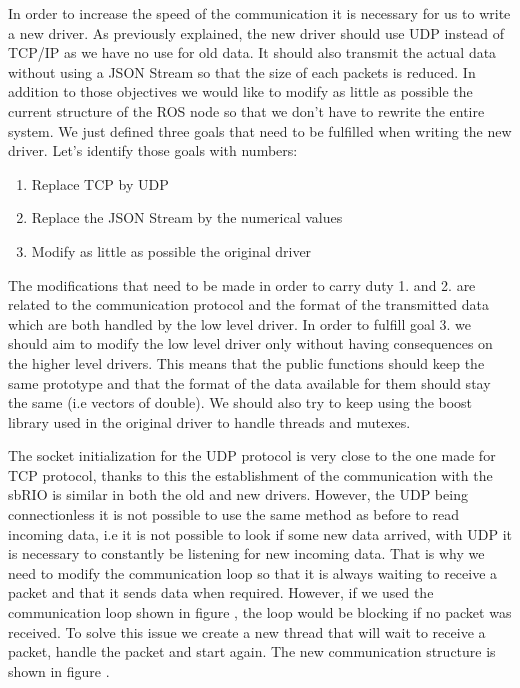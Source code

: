 In order to increase the speed of the communication it is necessary for us to write a new driver. As previously explained, the new driver should use UDP instead of TCP/IP as we have no use for old data. It should also transmit the actual data without using a JSON Stream so that the size of each packets is reduced. In addition to those objectives we would like to modify as little as possible the current structure of the ROS node so that we don't have to rewrite the entire system. 
We just defined three goals that need to be fulfilled when writing the new driver. Let's identify those goals with numbers:
\begin{enumerate}
	\item Replace TCP by UDP
	\item Replace the JSON Stream by the numerical values
	\item Modify as little as possible the original driver
\end{enumerate}

The modifications that need to be made in order to carry duty 1. and 2. are related to the communication protocol and the format of the transmitted data which are both handled by the low level driver. In order to fulfill goal 3. we should aim to modify the low level driver only without having consequences on the higher level drivers. This means that the public functions should keep the same prototype and that the format of the data available for them should stay the same (i.e vectors of double). We should also try to keep using the boost library used in the original driver to handle threads and mutexes.

The socket initialization for the UDP protocol is very close to the one made for TCP protocol, thanks to this the establishment of the communication with the sbRIO is similar in both the old and new drivers. However, the UDP being connectionless it is not possible to use the same method as before to read incoming data, i.e it is not possible to look if some new data arrived, with UDP it is necessary to constantly be listening for new incoming data. That is why we need to modify the communication loop so that it is always waiting to receive a packet and that it sends data when required. However, if we used the communication loop shown in figure , the loop would be blocking if no packet was received. To solve this issue we create a new thread that will wait to receive a packet, handle the packet and start again. The new communication structure is shown in figure .

